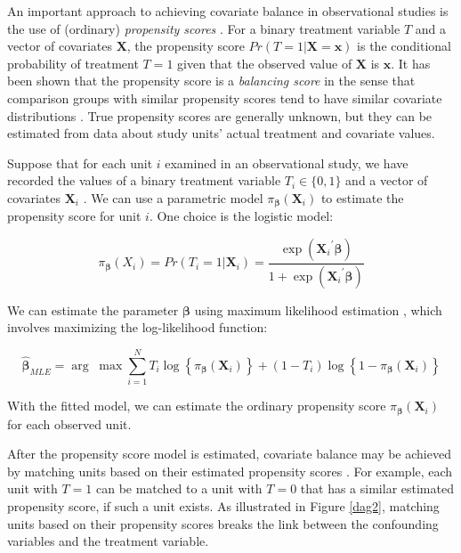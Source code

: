 \documentclass[times]{stvrauth}
\begin{document}
An important approach to achieving covariate balance in observational studies is the use of (ordinary) {\it propensity scores} \cite{Rosenbaum1983}.  For a binary treatment variable $T$ and a vector of covariates $\pmb{X}$, the propensity score $Pr(T=1|\pmb{X}=\pmb{x})$ is the conditional probability of treatment $T=1$ given that the observed value of $\pmb{X}$ is $\pmb{x}$.  It has been shown that the propensity score is a {\it balancing score} in the sense that comparison groups with similar propensity scores tend to have similar covariate distributions \cite{Rosenbaum1983}.  True propensity scores are generally unknown, but they can be estimated from data about study units' actual treatment and covariate values.

Suppose that for each unit $i$ examined in an observational study, we have recorded the values of a binary treatment variable ${T_i} \in \{ 0,1\} $ and a vector of covariates ${\pmb{X}_i}$ .  We can use a parametric model ${\pi _{\pmb\beta} }({\pmb{X}_i})$ to estimate the propensity score for unit $i$.  One choice is the logistic model:

\begin{equation*}
{\pi _{\pmb\beta} }({X_i}) = Pr({T_i} = 1|{\pmb{X}_i}) = \frac{{\exp ({\pmb{X}_i}^\prime \pmb\beta )}}{{1 + \exp ({\pmb{X}_i}^\prime \pmb\beta )}}
\end{equation*}

We can estimate the parameter $\pmb\beta$ using maximum likelihood estimation \cite{Silvapulle1981}, which involves maximizing the log-likelihood function:

\begin{equation}\label{eq1}
{\pmb{\hat \beta} _{MLE}} = \arg \;\max \sum\limits_{i = 1}^N {{T_i}\log \left\{ {{\pi _{\pmb\beta} }({\pmb{X}_i})} \right\} + (1 - {T_i})} \log \left\{ {1 - {\pi _{\pmb\beta} }({\pmb{X}_i})} \right\}
\end{equation}

With the fitted model, we can estimate the ordinary propensity score  ${\pi _{\pmb\beta}}({\pmb{X}_i})$ for each observed unit.

After the propensity score model is estimated, covariate balance may be achieved by matching units based on their estimated propensity scores \cite{Rosenbaum1983}.  For example, each unit with $T=1$ can be matched to a unit with $T=0$ that has a similar estimated propensity score, if such a unit exists.  As illustrated in Figure \ref{dag2}, matching units based on their propensity scores breaks the link between the confounding variables and the treatment variable.
\end{document}
